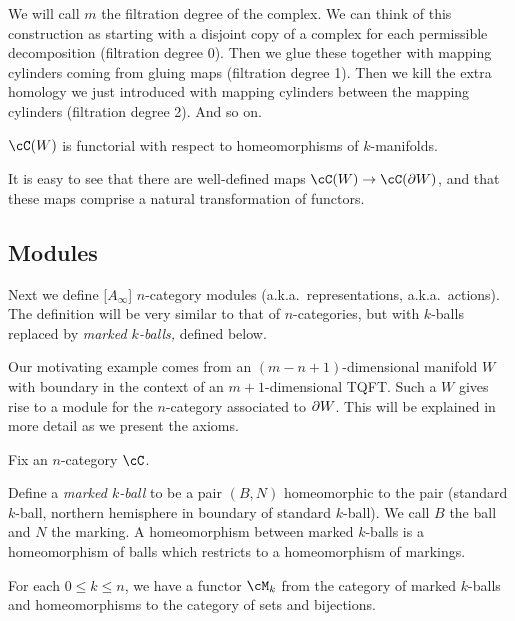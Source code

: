 We will call $m$ the filtration degree of the complex.
We can think of this construction as starting with a disjoint copy of a complex for each
permissible decomposition (filtration degree 0).
Then we glue these together with mapping cylinders coming from gluing maps
(filtration degree 1).
Then we kill the extra homology we just introduced with mapping cylinders between the mapping cylinders (filtration degree 2).
And so on.

$\cC(W)$ is functorial with respect to homeomorphisms of $k$-manifolds.

It is easy to see that
there are well-defined maps $\cC(W)\to\cC(\bd W)$, and that these maps
comprise a natural transformation of functors.




\subsection{Modules}

Next we define [$A_\infty$] $n$-category modules (a.k.a.\ representations,
a.k.a.\ actions).
The definition will be very similar to that of $n$-categories,
but with $k$-balls replaced by {\it marked $k$-balls,} defined below.

Our motivating example comes from an $(m{-}n{+}1)$-dimensional manifold $W$ with boundary
in the context of an $m{+}1$-dimensional TQFT.
Such a $W$ gives rise to a module for the $n$-category associated to $\partial W$.
This will be explained in more detail as we present the axioms.

Fix an $n$-category $\cC$.

Define a {\it marked $k$-ball} to be a pair $(B, N)$ homeomorphic to the pair
(standard $k$-ball, northern hemisphere in boundary of standard $k$-ball).
We call $B$ the ball and $N$ the marking.
A homeomorphism between marked $k$-balls is a homeomorphism of balls which
restricts to a homeomorphism of markings.

{For each $0 \le k \le n$, we have a functor $\cM_k$ from 
the category of marked $k$-balls and 
homeomorphisms to the category of sets and bijections.}

